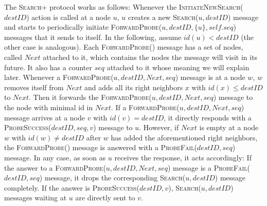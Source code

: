 \documentclass[a4paper,USenglish]{lipics}
\newcommand{\srp}{\textsc{Search+}\xspace}
\newcommand{\search}[1]{\textsc{Search(\ensuremath{#1})}\xspace}
\newcommand{\initsearch}[1]{\textsc{InitiateNewSearch(\ensuremath{#1})}\xspace}
\newcommand{\forwardprobe}[1]{\textsc{ForwardProbe(\ensuremath{#1})}\xspace}
\newcommand{\psuccess}[1]{\textsc{ProbeSuccess(\ensuremath{#1})}\xspace}
\newcommand{\pfail}[1]{\textsc{ProbeFail(\ensuremath{#1})}\xspace}
\begin{document}
The \srp protocol works as follows:
Whenever the \initsearch{destID} action is called at a node $u$, $u$ creates a new \search{u,destID} message and starts to periodically initiate \forwardprobe{u,destID, \{u\}, self.seq} messages that it sends to itself. 
In the following, assume $id(u)<destID$ (the other case is analogous).
Each \forwardprobe{} message has a set of nodes, called $Next$ attached to it, which contains the nodes the message will visit in its future. 
It also has a counter $seq$ attached to it whose meaning we will explain later.
Whenever a \forwardprobe{u,destID, Next, seq} message is at a node $w$, $w$ removes itself from $Next$ and adds all its right neighbors $x$ with $id(x) \leq destID$ to $Next$. 
Then it forwards the \forwardprobe{u,destID, Next, seq} message to the node with minimal id in $Next$.
If a \forwardprobe{u,destID, Next, seq} message arrives at a node $v$ with $id(v)=destID$, it directly responds with a \psuccess{destID,seq, v} message to $u$.
However, if $Next$ is empty at a node $w$ with $id(w) \neq destID$ after $w$ has added the aforementioned right neighbors, the \forwardprobe{} message is answered with a \pfail{destID,seq} message.
In any case, as soon as $u$ receives the response, it acts accordingly: If the answer to a \forwardprobe{u,destID,Next,seq} message is a \pfail{destID,seq} message, it drops the corresponding \search{u,destID} message completely.
If the answer is \psuccess{destID,v}, \search{u,destID} messages waiting at $u$ are directly sent to $v$.
\end{document}
